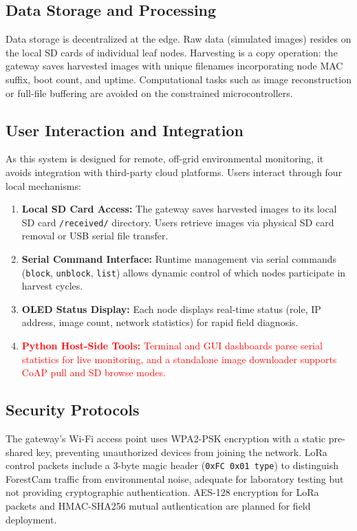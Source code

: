 \documentclass[12pt,a4paper]{article}
\DeclareRobustCommand{\changed}[1]{\textcolor{red}{#1}}
\begin{document}
\subsection{Data Storage and Processing}

Data storage is decentralized at the edge. Raw data (simulated images) resides on the local SD cards of individual leaf nodes. Harvesting is a copy operation: the gateway saves harvested images with unique filenames incorporating node MAC suffix, boot count, and uptime. Computational tasks such as image reconstruction or full-file buffering are avoided on the constrained microcontrollers.

\subsection{User Interaction and Integration}

As this system is designed for remote, off-grid environmental monitoring, it avoids integration with third-party cloud platforms. Users interact through four local mechanisms:

\begin{enumerate}
    \item \textbf{Local SD Card Access:} The gateway saves harvested images to its local SD card \texttt{/received/} directory. Users retrieve images via physical SD card removal or USB serial file transfer.
    \item \textbf{Serial Command Interface:} Runtime management via serial commands (\texttt{block}, \texttt{unblock}, \texttt{list}) allows dynamic control of which nodes participate in harvest cycles.
    \item \textbf{OLED Status Display:} Each node displays real-time status (role, IP address, image count, network statistics) for rapid field diagnosis.
    \item \changed{\textbf{Python Host-Side Tools:} Terminal and GUI dashboards parse serial statistics for live monitoring, and a standalone image downloader supports CoAP pull and SD browse modes.}
\end{enumerate}

\subsection{Security Protocols}

The gateway's Wi-Fi access point uses WPA2-PSK encryption with a static pre-shared key, preventing unauthorized devices from joining the network. LoRa control packets include a 3-byte magic header (\texttt{0xFC 0x01 type}) to distinguish ForestCam traffic from environmental noise, adequate for laboratory testing but not providing cryptographic authentication. AES-128 encryption for LoRa packets and HMAC-SHA256 mutual authentication are planned for field deployment.
\end{document}
